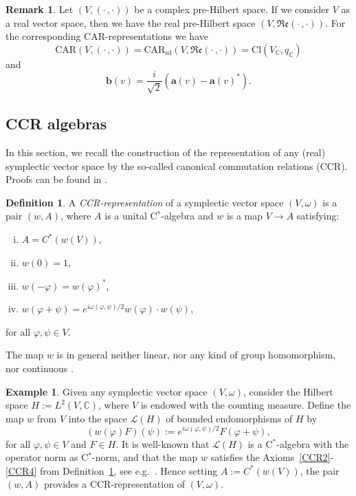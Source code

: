 \documentclass[a4paper,11pt]{amsart}
\theoremstyle{definition}
\newtheorem{ex}[thm]{Example}
\newtheorem{rem}[thm]{Remark}
\newtheorem{definition}[thm]{Definition}
\begin{document}
\begin{rem}\label{rem:RversusC}
Let $(V,(\cdot\,,\cdot))$ be a complex pre-Hilbert space.
If we consider $V$ as a real vector space, then we have the real pre-Hilbert space $(V,{\mathfrak{Re}}(\cdot\,,\cdot))$.
For the corresponding CAR-representations we have
$$
\mathrm{CAR}(V,(\cdot\,,\cdot)) 
= \mathrm{CAR}_\mathrm{sd}(V,{\mathfrak{Re}}(\cdot\,,\cdot))
= \mathrm{Cl}(V_{\mathbb{C}},q_{\mathbb{C}})
$$
and
$$
{\mathbf{b}}(v) = \frac{i}{\sqrt 2}({\mathbf{a}}(v)-{\mathbf{a}}(v)^*) .
$$
\end{rem}

\subsection{CCR algebras}\label{s:appendixCCR}

In this section, we recall the construction of the representation of any (real) symplectic vector space by the so-called canonical commutation relations (CCR). 
Proofs can be found in \cite[Sec.~4.2]{BGP}.

\begin{definition}\label{d:CCR}
A \emph{{\rm CCR}-representation} of a symplectic vector space $(V,\omega)$ is a pair $(w,A)$, where $A$ is a unital {\mbox{C$^*$}}-algebra and $w$ is a map $V\to A$ satisfying:
\begin{enumerate}[(i)]
\item\label{CCR1} 
$A=C^*(w(V))$,
\item\label{CCR2} 
$w(0)=1$,
\item\label{CCR3}  
$w(-{\varphi})=w({\varphi})^*$,
\item\label{CCR4}  
$w({\varphi}+\psi)=e^{i\omega({\varphi},\psi)/2}w({\varphi})\cdot w(\psi)$,
\end{enumerate}
for all ${\varphi},\psi\in V$.
\end{definition}

The map $w$ is in general neither linear, nor any kind of group homomorphism, nor continuous \cite[Prop. 4.2.3]{BGP}.

\begin{ex}\label{ex:CCR}
Given any symplectic vector space $(V,\omega)$, consider the Hilbert space $H:=L^2(V,\mathbb{C})$, where $V$ is endowed with the counting measure.
Define the map $w$ from $V$ into the space $\mathcal{L}(H)$ of bounded endomorphisms of $H$ by 
\[(w({\varphi})F)(\psi):=e^{i\omega({\varphi},\psi)/2}F({\varphi}+\psi),\]
for all ${\varphi},\psi\in V$ and $F\in H$. 
It is well-known that $\mathcal{L}(H)$ is a {\mbox{C$^*$}}-algebra with the operator norm as {\mbox{C$^*$}}-norm, and that the map $w$ satisfies the Axioms~\eqref{CCR2}-\eqref{CCR4} from Definition~\ref{d:CCR}, see e.g.\ \cite[Ex.~4.2.2]{BGP}. 
Hence setting $A:=C^*(w(V))$, the pair $(w,A)$ provides a {\rm CCR}-representation of $(V,\omega)$.
\end{ex}
\end{document}
